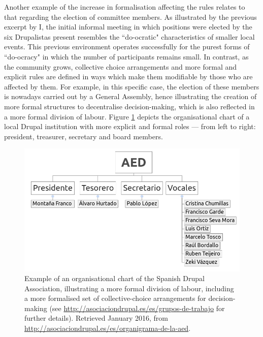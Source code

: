Another example of the increase in formalisation affecting the rules relates to that regarding the election of committee members. As illustrated by the previous excerpt by I, the initial informal meeting in which positions were elected by the six Drupalistas present resembles the ``do-ocratic" characteristics of smaller local events. This previous environment operates successfully for the purest forms of ``do-ocracy" in which the number of participants remains small. In contrast, as the community grows, collective choice arrangements and more formal and explicit rules are defined in ways which make them modifiable by those who are affected by them. For example, in this specific case, the election of these members is nowadays carried out by a General Assembly, hence illustrating the creation of more formal structures to decentralise decision-making, which is also reflected in a more formal division of labour. Figure \ref{spanish-drupal-assoc-dol} depicts the organisational chart of a local Drupal institution with more explicit and formal roles --- from left to right: president, treasurer, secretary and board members.

\begin{figure}[H]
\centering
\includegraphics[scale=0.4]{img/offline/aed_organigram}
\caption[Spanish Drupal Association organisational chart]%
{Example of an organisational chart of the Spanish Drupal Association, illustrating a more formal division of labour, including a more formalised set of collective-choice arrangements for decision-making (see \url{http://asociaciondrupal.es/es/grupos-de-trabajo} for further details). Retrieved  January 2016, from \url{http://asociaciondrupal.es/es/organigrama-de-la-aed}.}
\label{spanish-drupal-assoc-dol}
\end{figure}

